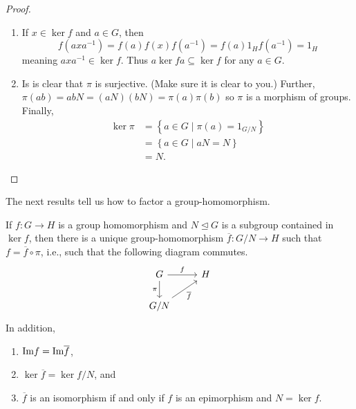 \documentclass[11pt,a4paper]{article}
\begin{document}
\begin{proof}
\begin{enumerate}[label=(\roman*)]
    \item If \(x\in \ker f\) and \(a\in G\), then 
    \[f(axa^{-1}) = f(a)f(x)f(a^{-1}) = f(a)1_H f(a^{-1}) = 1_H\]
    meaning \(axa^{-1} \in \ker f\).
    Thus \(a \ker f a \subseteq \ker f\) for any \(a\in G\).

    \item Is is clear that \(\pi\) is surjective. (Make sure it is clear to you.) Further, \(\pi (ab) = ab N = (aN)(bN) = \pi (a) \pi (b)\) so \(\pi\) is a morphism of groups.
    Finally, 
    \begin{align*}
        \ker \pi &= \left\{ a\in G \mid \pi (a) = 1_{G/N} \right\}\\
        &= \left\{ a\in G \mid aN  = N \right\}\\
        &= N.
    \end{align*}
\end{enumerate}
\end{proof}

 The next results tell us how to factor a group-homomorphism.

\begin{teo}
    If \( f: G \to H \) is a group homomorphism and \( N \trianglelefteq G \) is a subgroup contained in \( \ker f \), then there is a unique group-homomorphism \(\overline{f}\colon G/N \to H\) such that \(f = \overline{f}\circ \pi\), i.e., such that   the following diagram commutes.
    \[\begin{tikzcd}
        G \arrow[r, "f"] \arrow[d, "\pi"'] & H \\
        G/N \arrow[ru, "\overline{f}"']    &  
        \end{tikzcd}\]
    In addition, 
    \begin{enumerate}[label=(\roman*)]
        \item \(\text{Im} f = \text{Im} \overline{f}\),
        \item \(\ker \overline{f} = \ker f / N\), and 
        \item \(\overline{f} \) is an isomorphism if and only if \(f\) is an epimorphism and \(N = \ker f\).
    \end{enumerate}
\end{teo}
\end{document}
